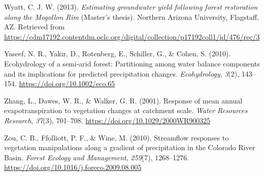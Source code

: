 \documentclass[
]{agujournal2019}
\newlength{\cslhangindent}
\newenvironment{CSLReferences}[2] %
 {\begin{list}{}{%
  \setlength{\itemindent}{0pt}
  \setlength{\leftmargin}{0pt}
  \setlength{\parsep}{0pt}
  \ifodd #1
   \setlength{\leftmargin}{\cslhangindent}
   \setlength{\itemindent}{-1\cslhangindent}
  \fi
  \setlength{\itemsep}{#2\baselineskip}}}
 {\end{list}}
\begin{document}
\begin{CSLReferences}{1}{0}
Wyatt, C. J. W. (2013). \emph{Estimating groundwater yield following
forest restoration along the {Mogollon} {Rim}} (Master's thesis).
Northern Arizona University, Flagstaff, AZ. Retrieved from
\url{https://cdm17192.contentdm.oclc.org/digital/collection/p17192coll1/id/476/rec/3}

Yaseef, N. R., Yakir, D., Rotenberg, E., Schiller, G., \& Cohen, S.
(2010). Ecohydrology of a semi‐arid forest: Partitioning among water
balance components and its implications for predicted precipitation
changes. \emph{Ecohydrology}, \emph{3}(2), 143--154.
\url{https://doi.org/10.1002/eco.65}

Zhang, L., Dawes, W. R., \& Walker, G. R. (2001). Response of mean
annual evapotranspiration to vegetation changes at catchment scale.
\emph{Water Resources Research}, \emph{37}(3), 701--708.
\url{https://doi.org/10.1029/2000WR900325}

Zou, C. B., Ffolliott, P. F., \& Wine, M. (2010). Streamflow responses
to vegetation manipulations along a gradient of precipitation in the
{Colorado} {River} {Basin}. \emph{Forest Ecology and Management},
\emph{259}(7), 1268--1276.
\url{https://doi.org/10.1016/j.foreco.2009.08.005}

\end{CSLReferences}
\end{document}
